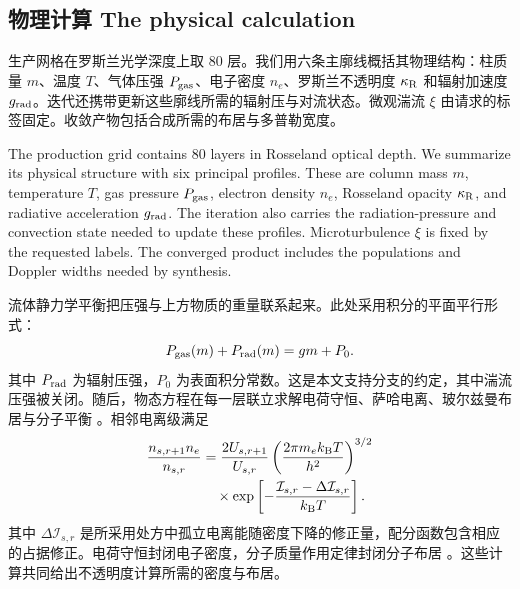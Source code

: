\subsection{物理计算 The physical calculation}

生产网格在罗斯兰光学深度上取 80 层。我们用六条主廓线概括其物理结构：柱质量 $m$、温度 $T$、气体压强 $P_{\rm gas}$、电子密度 $n_e$、罗斯兰不透明度 $\kappa_{\rm R}$ 和辐射加速度 $g_{\rm rad}$。迭代还携带更新这些廓线所需的辐射压与对流状态。微观湍流 $\xi$ 由请求的标签固定。收敛产物包括合成所需的布居与多普勒宽度。

\begin{EN}
The production grid contains 80 layers in Rosseland optical depth. We summarize
its physical structure with six principal profiles. These are column mass $m$,
temperature $T$, gas pressure $P_{\rm gas}$, electron density $n_e$, Rosseland
opacity $\kappa_{\rm R}$, and radiative acceleration $g_{\rm rad}$. The
iteration also carries the radiation-pressure and convection state needed to
update these profiles. Microturbulence $\xi$ is fixed by the requested labels. The
converged product includes the populations and Doppler widths needed by
synthesis.
\end{EN}

流体静力学平衡把压强与上方物质的重量联系起来。此处采用积分的平面平行形式：
\begin{equation}
P_{\rm gas}(m)+P_{\rm rad}(m)
=g m+P_0 .
\end{equation}
\noindent 其中 $P_{\rm rad}$ 为辐射压强，$P_0$ 为表面积分常数。这是本文支持分支的约定，其中湍流压强被关闭。随后，物态方程在每一层联立求解电荷守恒、萨哈电离、玻尔兹曼布居与分子平衡 \citep{Tsuji1973,Mihalas1978,HubenyMihalas2014}。相邻电离级满足
\begin{equation}
\begin{aligned}
\frac{n_{s,r+1}n_e}{n_{s,r}}
&=\frac{2U_{s,r+1}}{U_{s,r}}
\left(\frac{2\pi m_e k_{\rm B}T}{h^2}\right)^{3/2} \\
&\quad\times
\exp\left[-\frac{\mathcal{I}_{s,r}-\Delta\mathcal{I}_{s,r}}
{k_{\rm B}T}\right].
\end{aligned}
\end{equation}
\noindent 其中 $\Delta\mathcal{I}_{s,r}$ 是所采用处方中孤立电离能随密度下降的修正量，配分函数包含相应的占据修正。电荷守恒封闭电子密度，分子质量作用定律封闭分子布居 \citep{Tsuji1973,BarklemCollet2016}。这些计算共同给出不透明度计算所需的密度与布居。

